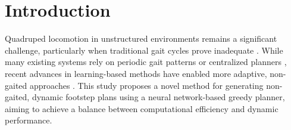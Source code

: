 \documentclass[../main.tex]{subfiles}
\begin{document}
\chapter{Introduction}

Quadruped locomotion in unstructured environments remains a
significant challenge, particularly when traditional gait cycles
prove inadequate \cite{Chai2022survey}. While many existing systems
rely on periodic gait
patterns or centralized planners \cite{Chai2022survey}, recent
advances in learning-based
methods have enabled more adaptive, non-gaited approaches
\cite{Fan2024survey}. This study
proposes a novel method for generating non-gaited, dynamic footstep
plans using a neural network-based greedy planner, aiming to achieve
a balance between computational efficiency and dynamic performance.






\end{document}
